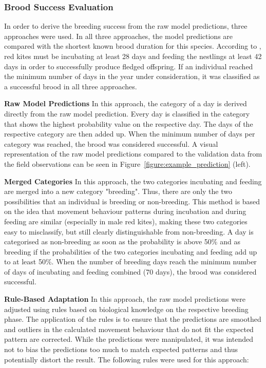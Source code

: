 \subsubsection{Brood Success Evaluation}
In order to derive the breeding success from the raw model predictions, three approaches were used. In all three approaches, the model predictions are compared with the shortest known brood duration for this species. According to \textcite{aebischer2021rotmilan}, red kites must be incubating at least 28 days and feeding the nestlings at least 42 days in order to successfully produce fledged offspring. If an individual reached the minimum number of days in the year under consideration, it was classified as a successful brood in all three approaches.

\vspace{1\baselineskip}
\noindent \textbf{Raw Model Predictions} \newline
\noindent In this approach, the category of a day is derived directly from the raw model prediction. Every day is classified in the category that shows the highest probability value on the respective day.
The days of the respective category are then added up. When the minimum number of days per category was reached, the brood was considered successful. A visual representation of the raw model predictions compared to the validation data from the field observations can be seen in Figure~\ref{figure:example_prediction} (left).

\vspace{1\baselineskip}
\noindent \textbf{Merged Categories} \newline
\noindent In this approach, the two categories incubating and feeding are merged into a new category "breeding". Thus, there are only the two possibilities that an individual is breeding or non-breeding. This method is based on the idea that movement behaviour patterns during incubation and during feeding are similar (especially in male red kites), making these two categories easy to misclassify, but still clearly distinguishable from non-breeding. A day is categorised as non-breeding as soon as the probability is above 50\% and as breeding if the probabilities of the two categories incubating and feeding add up to at least 50\%. When the number of breeding days reach the minimum number of days of incubating and feeding combined (70 days), the brood was considered successful.

\vspace{1\baselineskip}
\noindent \textbf{Rule-Based Adaptation} \newline
\noindent In this approach, the raw model predictions were adjusted using rules based on biological knowledge on the respective breeding phase. The application of the rules is to ensure that the predictions are smoothed and outliers in the calculated movement behaviour that do not fit the expected pattern are corrected. While the predictions were manipulated, it was intended not to bias the predictions too much to match expected patterns and thus potentially distort the result. The following rules were used for this approach:

